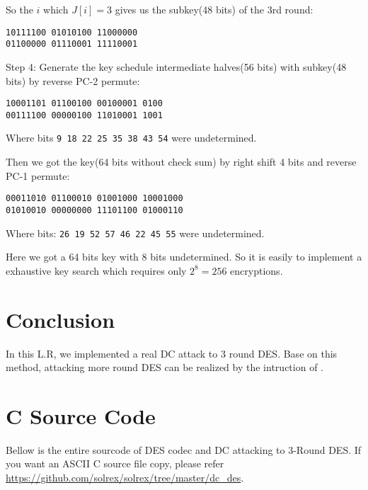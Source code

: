 \documentclass[a4paper,10pt]{article}
\begin{document}
So the $i$ which $J[i] = 3$ gives us the subkey(48 bits) of the 3rd round:
\begin{center}
\texttt{10111100 01010100 11000000}\\
\texttt{01100000 01110001 11110001}
\end{center}

\noindent\textsf{Step 4:} Generate the key schedule intermediate halves(56 bits) with subkey(48 bits) by reverse PC-2 permute\cite{DES}:
\begin{center}
\texttt{10001101 01100100 00100001 0100}\\
\texttt{00111100 00000100 11010001 1001}
\end{center}
Where bits \texttt{9 18 22 25 35 38 43 54} were undetermined.

Then we got the key(64 bits without check sum) by right shift 4 bits and reverse PC-1 permute\cite{DES}:
\begin{center}
\texttt{00011010 01100010 01001000 10001000}\\
\texttt{01010010 00000000 11101100 01000110}
\end{center}
Where bits: \texttt{26 19 52 57 46 22 45 55} were undetermined.

Here we got a 64 bits key with 8 bits undetermined. So it is easily to implement a exhaustive key search which requires only $2^8=256$ encryptions.

\section{Conclusion}

In this L.R, we implemented a real DC attack to 3 round DES. Base on this method, attacking more round DES can be realized by the intruction of \cite{BIHA91}.

\section{C Source Code}

Bellow is the entire sourcode of DES codec and DC attacking to 3-Round DES. If you want an ASCII C source file copy, please refer \url{https://github.com/solrex/solrex/tree/master/dc_des}.

\end{document}
